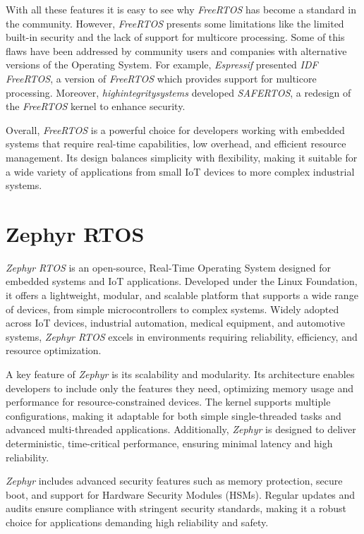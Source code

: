 With all these features it is easy to see why \textit{FreeRTOS} has become a standard
in the community. However, \textit{FreeRTOS} presents some limitations like the
limited built-in security and the lack of support for multicore processing. Some
of this flaws have been addressed by community users and companies with alternative
versions of the Operating System. For example, \textit{Espressif} presented
\textit{IDF FreeRTOS}\cite{idfrtos}, a version of \textit{FreeRTOS} which
provides support for multicore processing. Moreover, \textit{highintegritysystems}
developed \textit{SAFERTOS}\cite{safertos}, a redesign of the \textit{FreeRTOS} kernel
to enhance security.

Overall, \textit{FreeRTOS} is a powerful choice for developers working with embedded
systems that require real-time capabilities, low overhead, and efficient resource
management. Its design balances simplicity with flexibility, making it suitable for
a wide variety of applications from small IoT devices to more complex industrial
systems.

\section{Zephyr RTOS}
\label{sec:rtos_zephyr}

\textit{Zephyr RTOS}\cite{zephyrtos} is an open-source, Real-Time Operating System
designed for embedded systems and IoT applications. Developed under the Linux
Foundation, it offers a lightweight, modular, and scalable platform that supports
a wide range of devices, from simple microcontrollers to complex systems. Widely
adopted across IoT devices, industrial automation, medical equipment, and
automotive systems, \textit{Zephyr RTOS} excels in environments requiring
reliability, efficiency, and resource optimization.

A key feature of \textit{Zephyr} is its scalability and modularity. Its
architecture enables developers to include only the features they need, optimizing
memory usage and performance for resource-constrained devices. The kernel
supports multiple configurations, making it adaptable for both simple single-threaded
tasks and advanced multi-threaded applications. Additionally, \textit{Zephyr} is
designed to deliver deterministic, time-critical performance, ensuring minimal
latency and high reliability.

\textit{Zephyr} includes advanced security features such as memory protection,
secure boot, and support for Hardware Security Modules (HSMs). Regular updates
and audits ensure compliance with stringent security standards, making it a robust
choice for applications demanding high reliability and safety.

